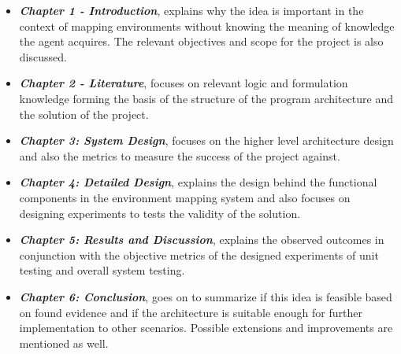 \begin{itemize}
	\item \textbf{\textit{Chapter 1 - Introduction}}, explains why the idea is important in the context of mapping environments without knowing the meaning of knowledge the agent acquires. The relevant objectives and scope for the project is also discussed. 
	

	\item \textbf{\textit{Chapter 2 -  Literature}}, focuses on relevant logic and formulation knowledge forming the basis of the structure of the program architecture and the solution of the project.

	\item \textbf{\textit{Chapter 3: System Design}}, focuses on the higher level architecture design and also the metrics to measure the success of the project against.
	
	\item \textbf{\textit{Chapter 4: Detailed Design}}, explains the design behind the functional components in the environment mapping system and also focuses on designing experiments to tests the validity of the solution.
	
	\item \textbf{\textit{Chapter 5: Results and Discussion}}, explains the observed outcomes in conjunction with the objective metrics of the designed experiments of unit testing and overall system testing.
	
	\item \textbf{\textit{Chapter 6: Conclusion}}, goes on to summarize if this idea is feasible based on found evidence and if the architecture is suitable enough for further implementation to other scenarios. Possible extensions and improvements are mentioned as well.
	
\end{itemize}







